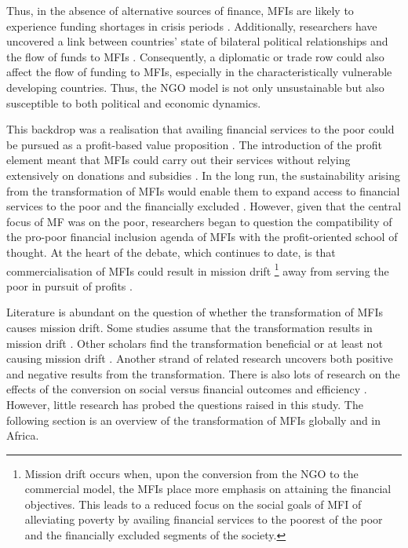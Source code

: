 \documentclass[a4paper, nobind]{templates/ociamthesis}
\begin{document}
Thus, in the absence of alternative sources of finance, MFIs are likely to experience funding shortages in crisis periods \autocite{constantinou2011financial}. Additionally, researchers have uncovered a link between countries' state of bilateral political relationships and the flow of funds to MFIs \autocite{garmaise2013cheap}. Consequently, a diplomatic or trade row could also affect the flow of funding to MFIs, especially in the characteristically vulnerable developing countries. Thus, the NGO model is not only unsustainable but also susceptible to both political and economic dynamics.

This backdrop was a realisation that availing financial services to the poor could be pursued as a profit-based value proposition \autocite{rhyne1999microfinance}. The introduction of the profit element meant that MFIs could carry out their services without relying extensively on donations and subsidies \autocite{duvendack2015mis}. In the long run, the sustainability arising from the transformation of MFIs would enable them to expand access to financial services to the poor and the financially excluded \autocite{brown2012microfinance,sarma2011ngo}. However, given that the central focus of MF was on the poor, researchers began to question the compatibility of the pro-poor financial inclusion agenda of MFIs with the profit-oriented school of thought. At the heart of the debate, which continues to date, is that commercialisation of MFIs could result in mission drift \footnote{Mission drift occurs when, upon the conversion from the NGO to the commercial model, the MFIs place more emphasis on attaining the financial objectives. This leads to a reduced focus on the social goals of MFI of alleviating poverty by availing financial services to the poorest of the poor and the financially excluded segments of the society.} away from serving the poor in pursuit of profits \autocite{im2015profits,mia2017mission}.

Literature is abundant on the question of whether the transformation of MFIs causes mission drift. Some studies assume that the transformation results in mission drift \autocite{mia2017mission,wagenaar2012institutional,lopatta2017sustainable,roberts2013endogeneity}. Other scholars find the transformation beneficial or at least not causing mission drift \autocite{im2015profits,lutzenkirchen2012microfinance,quayes2012depth,mersland2010microfinance}. Another strand of related research uncovers both positive and negative results from the transformation\autocite{kar2012does,caudill2009microfinance}. There is also lots of research on the effects of the conversion on social versus financial outcomes and efficiency \autocite{bogan2012capital,kar2012does,tchuigoua2014institutional,khachatryan2017performance}. However, little research has probed the questions raised in this study. The following section is an overview of the transformation of MFIs globally and in Africa.
\end{document}
